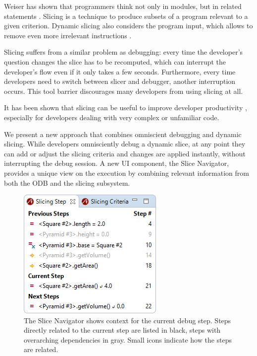 ﻿\documentclass[
      english,
			conference,
      ]{IEEEtran}
\begin{document}
Weiser has shown that programmers think not only in modules, but in related statements \cite{weiser_programmers_1982}.
Slicing is a technique to produce subsets of a program relevant to a given criterion.
Dynamic slicing also considers the program input, which allows to remove even more irrelevant instructions \cite{agrawal_dynamic_1990}.

Slicing suffers from a similar problem as debugging:
every time the developer's question changes the slice has to be recomputed, which can interrupt the developer's flow even if it only takes a few seconds.
Furthermore, every time developers need to switch between slicer and debugger, another interruption occurs.
This tool barrier discourages many developers from using slicing at all.

It has been shown that slicing can be useful to improve developer productivity \cite{weiser_programmers_1982, agrawal_dynamic_1990}, especially for developers dealing with very complex or unfamiliar code.

We present a new approach that combines omniscient debugging and dynamic slicing.
While developers omnisciently debug a dynamic slice, at any point they can add or adjust the slicing criteria and changes are applied instantly, without interrupting the debug session.
A new UI component, the Slice Navigator, provides a unique view on the execution by combining relevant information from both the ODB and the slicing subsystem.

\begin{figure}
	\centering
		\includegraphics[width=0.80\linewidth]{slice1.png}
	\caption{The Slice Navigator shows context for the current debug step. Steps directly related to the current step are listed in black, steps with overarching dependencies in gray. Small icons indicate how the steps are related.}
	\label{fig:slice1}
\end{figure}
\end{document}
